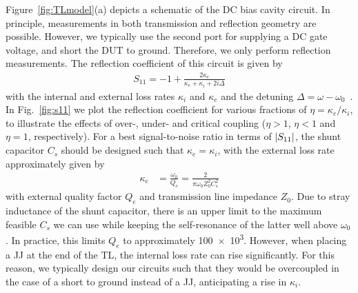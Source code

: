 Figure~\ref{fig:TLmodel}(a) depicts a schematic of the DC bias cavity circuit.
%
In principle, measurements in both transmission and reflection geometry are possible.
%
However, we typically use the second port for supplying a DC gate voltage, and short the DUT to ground.
%
Therefore, we only perform reflection measurements.
%
The reflection coefficient of this circuit is given by
%
\begin{align}
S_{11}=-1+\frac{2\kappa_e}{\kappa_e+\kappa_i+2i\Delta}
\label{eq:intro-s11}
\end{align}
%
with the internal and external loss rates $\kappa_i$ and $\kappa_e$ and the detuning $\Delta=\omega-\omega_0$~\cite{bosmanBroadbandArchitectureGalvanically2015c}.
%
In Fig.~\ref{fig:s11} we plot the reflection coefficient for various fractions of $\eta =\kappa_e/\kappa_i$, to illustrate the effects of over-, under- and critical coupling ($\eta >1$, $\eta <1$ and $\eta =1$, respectively).
%
For a best signal-to-noise ratio in terms of $\lvert S_{11}\rvert$, the shunt capacitor $C_s$ should be designed such that $\kappa_e=\kappa_i$, with the external loss rate approximately given by
%
\begin{align}
\kappa_e &= \frac{\omega_0}{Q_e} = \frac{2}{\pi\omega_0Z_0^2C_s^2}
\label{eq:intro-kappae}
\end{align}
%
with external quality factor $Q_e$ and transmission line impedance $Z_0$.
%
Due to stray inductance of the shunt capacitor, there is an upper limit to the maximum feasible $C_s$ we can use while keeping the self-resonance of the latter well above $\omega_0$.
%
In practice, this limits $Q_e$ to approximately \num{100e3}.
%
However, when placing a JJ at the end of the TL, the internal loss rate can rise significantly.
%
For this reason, we typically design our circuits such that they would be overcoupled in the case of a short to ground instead of a JJ, anticipating a rise in $\kappa_i$.


